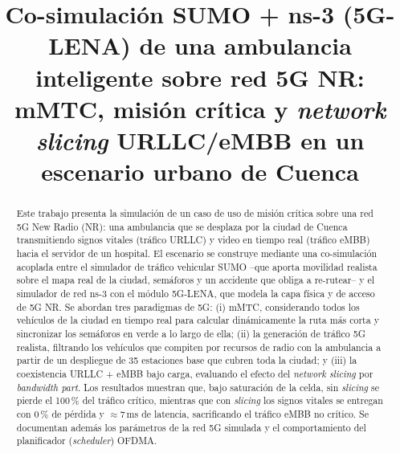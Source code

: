 \documentclass[conference,onecolumn]{IEEEtran}
\begin{document}
\title{Co-simulación SUMO + ns-3 (5G-LENA) de una ambulancia inteligente sobre
red 5G NR: mMTC, misión crítica y \textit{network slicing} URLLC/eMBB en un
escenario urbano de Cuenca}

\author{
\and
{}
}

\maketitle

\begin{abstract}
Este trabajo presenta la simulación de un caso de uso de misión crítica sobre
una red 5G New Radio (NR): una ambulancia que se desplaza por la ciudad de
Cuenca transmitiendo signos vitales (tráfico URLLC) y video en tiempo real
(tráfico eMBB) hacia el servidor de un hospital. El escenario se construye
mediante una co-simulación acoplada entre el simulador de tráfico vehicular
SUMO --que aporta movilidad realista sobre el mapa real de la ciudad, semáforos
y un accidente que obliga a re-rutear-- y el simulador de red ns-3 con el módulo
5G-LENA, que modela la capa física y de acceso de 5G NR. Se abordan tres
paradigmas de 5G: (i) mMTC, considerando todos los vehículos de la ciudad en
tiempo real para calcular dinámicamente la ruta más corta y sincronizar los
semáforos en verde a lo largo de ella; (ii) la generación de tráfico 5G
realista, filtrando los vehículos que compiten por recursos de radio con la
ambulancia a partir de un despliegue de 35 estaciones base que cubren toda la
ciudad; y (iii) la coexistencia URLLC + eMBB bajo carga, evaluando el efecto del
\textit{network slicing} por \textit{bandwidth part}. Los resultados muestran
que, bajo saturación de la celda, sin \textit{slicing} se pierde el 100\,\% del
tráfico crítico, mientras que con \textit{slicing} los signos vitales se
entregan con 0\,\% de pérdida y $\approx$7\,ms de latencia, sacrificando el
tráfico eMBB no crítico. Se documentan además los parámetros de la red 5G
simulada y el comportamiento del planificador (\textit{scheduler}) OFDMA.
\end{abstract}
\end{document}
